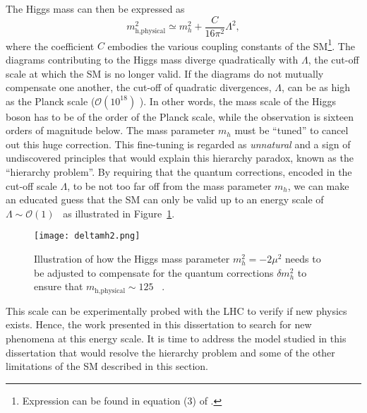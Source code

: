 The Higgs mass can then be expressed as
\begin{equation}
 m_\text{h,physical}^2 \simeq m_h^2 + \frac{C}{16\pi^2}\Lambda^2,
\end{equation}
where the coefficient $C$ embodies the various coupling constants of the SM\footnote{Expression can be found in equation (3) of \cite{Baer:2015fsa}.}.
The diagrams contributing to the Higgs mass diverge quadratically with $\Lambda$, the cut-off scale at which the SM is no longer valid.
If the diagrams do not mutually compensate one another, the cut-off of quadratic divergences, $\Lambda$, can be as high as the Planck scale ($\mathcal{O}\left(10^{18}\right)$ \GeV).
In other words, the mass scale of the Higgs boson has to be of the order of the Planck scale, while the observation is sixteen orders of magnitude below.
The mass parameter $m_h$ must be ``tuned'' to cancel out this huge correction.
This fine-tuning is regarded as \textit{unnatural} and a sign of undiscovered principles that would explain this hierarchy paradox, known as the ``hierarchy problem''.
By requiring that the quantum corrections, encoded in the cut-off scale $\Lambda$, to be not too far off from the mass parameter $m_h$, we can make an educated 
guess that the SM can only be valid up to an energy scale of $\Lambda \sim \mathcal{O}\left(1\right)$ \TeV~as illustrated in Figure~\ref{fig:theory.sm.deltamh2}.
\begin{figure}[htb!]
\centering
\texttt{[image: deltamh2.png]}
\caption{Illustration of how the Higgs mass parameter $m_h^2 = -2\mu^2$ needs to be adjusted to compensate for the quantum corrections $\delta m_h^2$ to ensure 
that $m_\text{h,physical} \sim 125$ \GeV~\cite{Bae:2015jea}.}
\label{fig:theory.sm.deltamh2}
\end{figure} 
This scale can be experimentally probed with the LHC to verify if new physics exists. Hence, the work presented in this dissertation to search for new phenomena 
at this energy scale.
It is time to address the model studied in this dissertation that would resolve the hierarchy problem and some of the other limitations of the SM described in this section.
